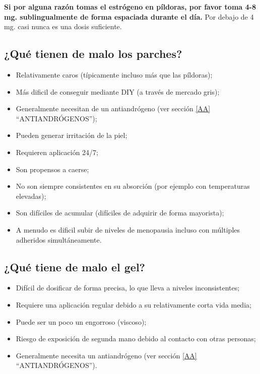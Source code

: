 \documentclass{article}
\begin{document}
\textbf{Si por alguna razón tomas el estrógeno en píldoras, por favor toma 4-8 mg. sublingualmente de forma espaciada durante el día.} Por debajo de 4 mg. casi nunca es una dosis suficiente.

\subsection{¿Qué tienen de malo los parches?}

\begin{itemize}
  \item Relativamente caros (típicamente incluso más que las píldoras);
  \item Más dificil de conseguir mediante DIY (a través de mercado gris);
  \item Generalmente necesitan de un antiandrógeno (ver sección \ref{AA} “ANTIANDRÓGENOS”);
  \item Pueden generar irritación de la piel;
  \item Requieren aplicación 24/7;
  \item Son propensos a caerse;
  \item No son siempre consistentes en su absorción (por ejemplo con temperaturas elevadas);
  \item Son difíciles de acumular (difíciles de adquirir de forma mayorista);
  \item A menudo es dificil subir de niveles de menopausia incluso con múltiples adheridos simultáneamente.
\end{itemize}

\subsection{¿Qué tiene de malo el gel?}

\begin{itemize}
  \item Difícil de dosificar de forma precisa, lo que lleva a niveles inconsistentes;
  \item Requiere una aplicación regular debido a su relativamente corta vida media;
  \item Puede ser un poco un engorroso (viscoso);
  \item Riesgo de exposición de segunda mano debido al contacto con otras personas;
  \item Generalmente necesita un antiandrógeno (ver sección \ref{AA} “ANTIANDRÓGENOS”).
\end{itemize}
\end{document}
